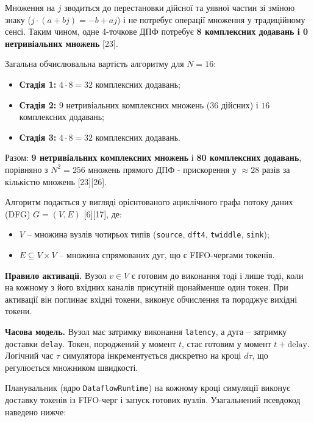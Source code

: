 \documentclass[
]{article}
\newcommand{\passthrough}[1]{#1}
\begin{document}
Множення на \(j\) зводиться до перестановки дійсної та уявної частин зі
зміною знаку (\(j \cdot (a + bj) = - b + aj\)) і не потребує операції
множення у традиційному сенсі. Таким чином, одне 4-точкове ДПФ потребує
\textbf{8 комплексних додавань і 0 нетривіальних множень} {[}23{]}.

Загальна обчислювальна вартість алгоритму для \(N = 16\):

\begin{itemize}
\item
  \textbf{Стадія 1:} \(4 \cdot 8 = 32\) комплексних додавань;
\item
  \textbf{Стадія 2:} \(9\) нетривіальних комплексних множень (\(36\)
  дійсних) і \(16\) комплексних додавань;
\item
  \textbf{Стадія 3:} \(4 \cdot 8 = 32\) комплексних додавань.
\end{itemize}

Разом: \textbf{9 нетривіальних комплексних множень} і \textbf{80
комплексних додавань}, порівняно з \(N^{2} = 256\) множень прямого ДПФ -
прискорення у \(\approx 28\) разів за кількістю множень
{[}23{]}{[}26{]}.

Алгоритм подається у вигляді орієнтованого ациклічного графа потоку
даних (DFG) \(G = (V,E)\) {[}6{]}{[}17{]}, де:

\begin{itemize}
\item
  \(V\) -- множина вузлів чотирьох типів
  (\passthrough{\lstinline!source!},
  \passthrough{\lstinline!dft!}\passthrough{\lstinline!4!},
  \passthrough{\lstinline!twiddle!}, \passthrough{\lstinline!sink!});
\item
  \(E \subseteq V \times V\) -- множина спрямованих дуг, що є
  FIFO-чергами токенів.
\end{itemize}

\textbf{Правило активації.} Вузол \(v \in V\) є готовим до виконання
тоді і лише тоді, коли на кожному з його вхідних каналів присутній
щонайменше один токен. При активації він поглинає вхідні токени, виконує
обчислення та породжує вихідні токени.

\textbf{Часова модель.} Вузол має затримку виконання
\passthrough{\lstinline!latency!}, а дуга -- затримку доставки
\passthrough{\lstinline!delay!}. Токен, породжений у момент \(t\), стає
готовим у момент \(t + \text{delay}\). Логічний час \(\tau\) симулятора
інкрементується дискретно на кроці \(d\tau\), що регулюється множником
швидкості.

Планувальник (ядро \passthrough{\lstinline!DataflowRuntime!}) на кожному
кроці симуляції виконує доставку токенів із FIFO-черг і запуск готових
вузлів. Узагальнений псевдокод наведено нижче:
\end{document}
